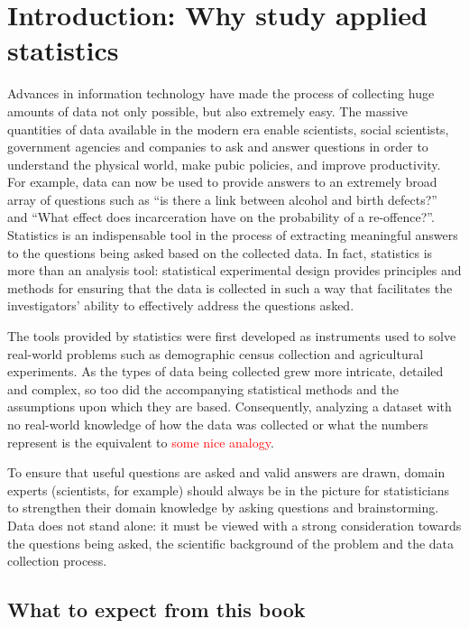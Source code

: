 

\chapter*{Introduction: Why study applied statistics}
\label{ch:intro}



Advances in information technology have made the process of collecting huge amounts of data not only possible, but also extremely easy. The massive quantities of data available in the modern era enable scientists, social scientists, government agencies and companies to ask and answer questions in order to understand the physical world, make pubic policies, and improve productivity. For example, data can now be used to provide answers to an extremely broad array of questions such as ``is there a link between alcohol and birth defects?'' and ``What effect does incarceration have on the probability of a re-offence?''. Statistics is an indispensable tool in the process of extracting meaningful answers to the questions being asked based on the collected data. In fact, statistics is more than an analysis tool: statistical experimental design provides principles and methods for ensuring that the data is collected in such a way that facilitates the investigators' ability to effectively address the questions asked.

The tools provided by statistics were first developed as instruments used to solve real-world problems such as demographic census collection and agricultural experiments. As the types of data being collected grew more intricate, detailed and complex, so too did the accompanying statistical methods and the assumptions upon which they are based. Consequently, analyzing a dataset with no real-world knowledge of how the data was collected or what the numbers represent is the equivalent to \textcolor{red}{some nice analogy}. 


To ensure that useful questions are asked and valid answers are drawn, domain experts (scientists, for example) should always be in the picture for statisticians to strengthen their domain knowledge by asking questions and brainstorming. Data does not stand alone: it must be viewed with a strong consideration towards the questions being asked, the scientific background of the problem and the data collection process.



\section*{What to expect from this book}

